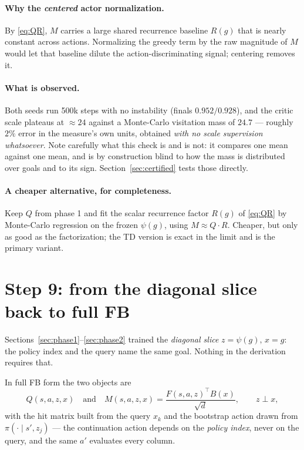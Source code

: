 \documentclass[11pt]{article}
\begin{document}
\paragraph{Why the \emph{centered} actor normalization.} By \eqref{eq:QR}, $M$
carries a large shared recurrence baseline $R(g)$ that is nearly constant across
actions. Normalizing the greedy term by the raw magnitude of $M$ would let that
baseline dilute the action-discriminating signal; centering removes it.

\paragraph{What is observed.} Both seeds run 500k steps with no instability
(finals $0.952 / 0.928$), and the critic scale plateaus at $\approx 24$ against a
Monte-Carlo visitation mass of $24.7$ --- roughly $2\%$ error in the measure's own
units, obtained \emph{with no scale supervision whatsoever}. Note carefully what
this check is and is not: it compares one mean against one mean, and is by
construction blind to how the mass is distributed over goals and to its sign.
Section~\ref{sec:certified} tests those directly.

\paragraph{A cheaper alternative, for completeness.} Keep $Q$ from phase 1 and fit
the scalar recurrence factor $R(g)$ of \eqref{eq:QR} by Monte-Carlo regression on
the frozen $\psi(g)$, using $M\approx Q\cdot R$. Cheaper, but only as good as the
factorization; the TD version is exact in the limit and is the primary variant.

\section{Step 9: from the diagonal slice back to full FB}

Sections~\ref{sec:phase1}--\ref{sec:phase2} trained the \emph{diagonal slice}
$z=\psi(g),\,x=g$: the policy index and the query name the same goal. Nothing in
the derivation requires that.

In full FB form the two objects are
\[
Q(s,a,z,x) \quad\text{and}\quad M(s,a,z,x)=\frac{F(s,a,z)^{\top}B(x)}{\sqrt d},
\qquad z \perp x,
\]
with the hit matrix built from the query $x_k$ and the bootstrap action drawn from
$\pi(\cdot\mid s',z_j)$ --- the continuation action depends on the \emph{policy
index}, never on the query, and the same $a'$ evaluates every column.
\end{document}
